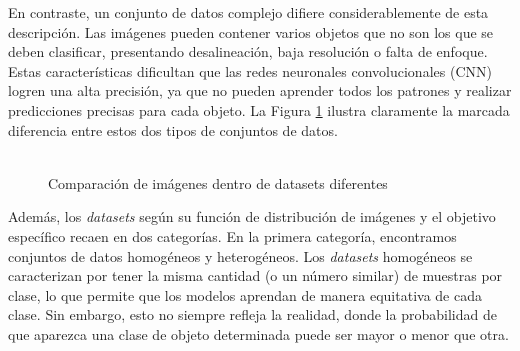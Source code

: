 En contraste, un conjunto de datos complejo difiere considerablemente de 
esta descripción. Las imágenes pueden contener varios objetos que no son 
los que se deben clasificar, presentando desalineación, baja resolución 
o falta de enfoque. Estas características dificultan que las redes 
neuronales convolucionales (CNN) logren una alta precisión, ya que no 
pueden aprender todos los patrones y realizar predicciones precisas para 
cada objeto. La Figura \ref{fig:combined} ilustra claramente la marcada 
diferencia entre estos dos tipos de conjuntos de datos.
\\\\
\begin{figure}
    \centering
    \qquad
    \caption{Comparación de imágenes dentro de datasets diferentes}%
    \label{fig:combined}
\end{figure}
Además, los \textit{datasets} según su función de distribución de imágenes y 
el objetivo específico recaen en dos categorías. En la primera categoría, 
encontramos conjuntos de datos homogéneos y heterogéneos. Los \textit{datasets} 
homogéneos se caracterizan por 
tener la misma cantidad (o un número similar) de muestras por clase, lo que 
permite que los modelos aprendan de manera equitativa de cada clase. Sin embargo, 
esto no siempre refleja la realidad, donde la probabilidad de que aparezca una 
clase de objeto determinada puede ser mayor o menor que otra.
\\\\

